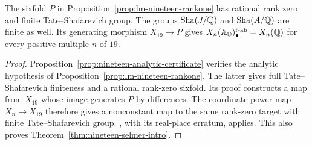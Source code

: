 \begin{corollary}
\label{cor:nineteen-finite-sha}
The sixfold $P$ in Proposition~\ref{prop:lm-nineteen-rankone}
has rational rank zero and finite Tate--Shafarevich group. The groups
$\operatorname{Sha}(J/\mathbb Q)$ and $\operatorname{Sha}(A/\mathbb Q)$ are finite as well. Its generating
morphism $X_{19}\to P$ gives
$X_n(\mathbb A_\mathbb Q)_\bullet^{\mathrm{f\text{-}ab}}=X_n(\mathbb Q)$ for every
positive multiple $n$ of $19$.
\end{corollary}
\begin{proof}
Proposition~\ref{prop:nineteen-analytic-certificate} verifies the
analytic hypothesis of Proposition~\ref{prop:lm-nineteen-rankone}.
The latter gives full Tate--Shafarevich finiteness and a rational
rank-zero sixfold. Its proof constructs a map from $X_{19}$ whose
image generates $P$ by differences. The coordinate-power map
$X_n\to X_{19}$ therefore gives a nonconstant map to the same
rank-zero target with finite Tate--Shafarevich group.
\citet[Theorem~8.6, p.~385]{Stoll2007}, with its real-place erratum,
applies. This also proves Theorem~\ref{thm:nineteen-selmer-intro}.
\end{proof}
